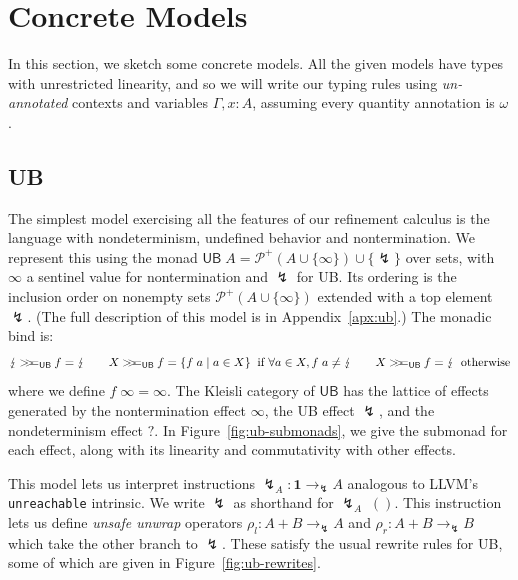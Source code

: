 \documentclass[acmsmall,screen,anonymous,review]{acmart}
\newcommand{\mc}[1]{\ensuremath{\mathcal{#1}}}
\newcommand{\mb}[1]{\ensuremath{\mathbf{#1}}}
\newcommand{\ms}[1]{\ensuremath{\mathsf{#1}}}
\newcommand{\topq}{\omega}
\newcommand{\ubeff}{\lightning}
\newcommand{\obind}{\mathbin{>\!\!>\mkern-6.7mu=}}
\newcommand{\mbind}[3]{#2 \obind_{#1} #3}
\begin{document}
\section{Concrete Models}

In this section, we sketch some concrete models. All the given models have types with unrestricted
linearity, and so we will write our typing rules using \emph{un-annotated} contexts and variables
$\Gamma, x: A$, assuming every quantity annotation is $\topq$. 

\subsection{UB}

\label{ssec:ub}

The simplest model exercising all the features of our refinement calculus is the language with
nondeterminism, undefined behavior and nontermination. We represent this using the monad $\ms{UB}\;A
= \mc{P}^+(A \cup \{\infty\}) \cup \{\ubeff\}$ over sets, with $\infty$ a sentinel value for
nontermination and $\ubeff$ for UB. Its ordering is the inclusion order on nonempty sets $\mc{P}^+(A
\cup \{\infty\})$ extended with a top element $\ubeff$. (The full description of this model is in
Appendix~\ref{apx:ub}.) The monadic bind is:
$$
\mbind{\ms{UB}}{\ubeff}{f} = \ubeff \qquad
\mbind{\ms{UB}}{X}{f} = \{f\;a \mid a \in X\} \;\; \text{if } \forall a \in X, f\;a \neq \ubeff
\qquad
\mbind{\ms{UB}}{X}{f} = \ubeff \;\; \text{otherwise}
$$
where we define $f\;\infty = \infty$. 
%
The Kleisli category of $\ms{UB}$ has the lattice of effects generated by the nontermination effect
$\infty$, the UB effect $\ubeff$, and the nondeterminism effect $?$. In
Figure~\ref{fig:ub-submonads}, we give the submonad for each effect, along with its linearity and
commutativity with other effects.

This model lets us interpret instructions $\ubeff_A: \mb{1} \to_\ubeff A$ analogous to LLVM's
\texttt{unreachable} intrinsic. We write $\ubeff$ as shorthand for 
$\ubeff_A\;()$. This instruction lets us define \emph{unsafe unwrap} operators
$\rho_l : A + B \to_\ubeff A$ and $\rho_r : A + B \to_\ubeff B$
which take the other branch to $\ubeff$.
%
These satisfy the usual rewrite rules for UB, some of which are given in 
Figure~\ref{fig:ub-rewrites}.
\end{document}

